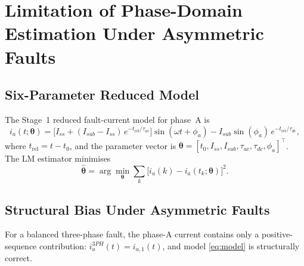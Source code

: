 \documentclass[10pt,journal,twoside]{IEEEtran}
\begin{document}
\section{Limitation of Phase-Domain Estimation Under Asymmetric Faults}
\label{sec:limitation}

\subsection{Six-Parameter Reduced Model}
\label{sec:limitation:model}

The Stage~1 reduced fault-current model for phase~A is
\cite{Eluvathingal2025_TR01}
\begin{equation}
i_a(t; \bm{\theta}) =
  \bigl[I_{ss} + (I_{sub} - I_{ss})\,e^{-t_{\mathrm{rel}}/\tau_{ac}}\bigr]
  \sin(\omega t + \phi_a)
  - I_{sub}\sin(\phi_a)\,e^{-t_{\mathrm{rel}}/\tau_{dc}},
\label{eq:model}
\end{equation}
where $t_{\mathrm{rel}} = t - t_0$, and the parameter vector is
$\bm{\theta} = [t_0, I_{ss}, I_{sub}, \tau_{ac}, \tau_{dc}, \phi_a]^\top$.
The LM estimator minimises
\begin{equation}
\hat{\bm{\theta}} = \arg\min_{\bm{\theta}}
  \sum_{k} \bigl[i_a(k) - i_a(t_k;\bm{\theta})\bigr]^2.
\label{eq:lsq}
\end{equation}

\subsection{Structural Bias Under Asymmetric Faults}
\label{sec:limitation:bias}

For a balanced three-phase fault, the phase-A current contains only a
positive-sequence contribution: $i_a^{3PH}(t) = i_{a,1}(t)$, and model
\eqref{eq:model} is structurally correct.
\end{document}
